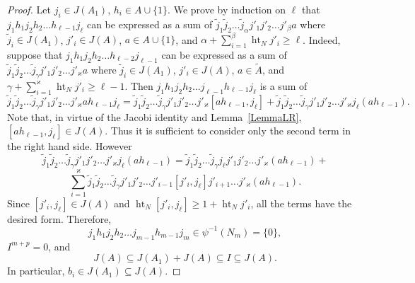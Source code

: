 \documentclass[12pt, reqno, a4paper]{amsart}
\theoremstyle{plain}
\theoremstyle{remark}
\theoremstyle{definition}
\begin{document}
\begin{proof}
 Let $j_i \in J(A_1)$, $h_i \in A \cup \lbrace 1\rbrace$.
We prove by induction on $\ell$ that
$j_1 h_1 j_2 h_2 \ldots h_{\ell-1} j_{\ell}$
can be expressed as a sum of $\tilde j_1 \tilde j_2 \ldots \tilde j_\alpha j'_1 j'_2\ldots j'_\beta
a$
where $\tilde j_i \in J(A_1)$, $j'_i \in J(A)$,
$a \in A \cup \lbrace 1\rbrace$,
 and $\alpha+\sum_{i=1}^\beta \operatorname{ht}_N j'_i \geqslant \ell$.
 Indeed, suppose that $j_1 h_1 j_2 h_2 \ldots h_{\ell-2} j_{\ell-1}$
 can be expressed as a sum of $\tilde j_1 \tilde j_2 \ldots \tilde j_\gamma j'_1 j'_2\ldots j'_\varkappa
a$
where $\tilde j_i \in J(A_1)$, $j'_i \in J(A)$,
$a \in \tilde A$,
 and $\gamma+\sum_{i=1}^\varkappa \operatorname{ht}_N j'_i \geqslant \ell-1$.
 Then
 $j_1 h_1 j_2 h_2 \ldots j_{\ell-1} h_{\ell-1}j_{\ell}$
 is a sum of
 $$\tilde j_1 \tilde j_2 \ldots \tilde j_\gamma j'_1 j'_2\ldots j'_\varkappa
a h_{\ell-1}j_{\ell} =
\tilde j_1 \tilde j_2 \ldots \tilde j_\gamma j'_1 j'_2\ldots j'_\varkappa
[ah_{\ell-1}, j_{\ell}] + \tilde j_1 \tilde j_2 \ldots \tilde j_\gamma j'_1 j'_2\ldots j'_\varkappa
j_{\ell} (a h_{\ell-1}).$$
Note that, in virtue of the Jacobi identity
and Lemma~\ref{LemmaLR},  $[ah_{\ell-1}, j_{\ell}] \in
J(A)$. Thus it is sufficient to consider only the second term
in the right hand side.
However
$$\tilde j_1 \tilde j_2 \ldots \tilde j_\gamma j'_1 j'_2\ldots j'_\varkappa
j_{\ell} (a h_{\ell-1})
= \tilde j_1 \tilde j_2 \ldots \tilde j_\gamma j_{\ell} j'_1 j'_2\ldots j'_\varkappa
 (a h_{\ell-1})+$$ $$\sum_{i=1}^{\varkappa}
\tilde j_1 \tilde j_2 \ldots \tilde j_\gamma  j'_1 j'_2\ldots j'_{i-1}[j'_{i}, j_\ell]
j'_{i+1}\ldots j'_\varkappa (a h_{\ell-1}).$$
Since $[j'_{i}, j_\ell] \in J(A)$ and $\operatorname{ht}_N [j'_{i}, j_\ell] \geqslant 1+ \operatorname{ht}_N j'_i$,
all the terms have  the desired form.
 Therefore, $$j_1 h_1 j_2 h_2 \ldots j_{m-1} h_{m-1}j_{m}
 \in \psi^{-1}(N_m) = \lbrace 0 \rbrace,$$ $I^{m+p}=0$, and $$
 J(A) \subseteq J(A_1)+J(A) \subseteq I \subseteq J(A).$$ In particular,
$b_i \in J(A_1) \subseteq J(A)$.
\end{proof}
\end{document}
